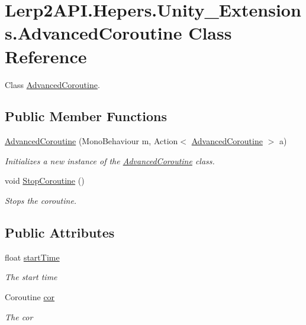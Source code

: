 \hypertarget{class_lerp2_a_p_i_1_1_hepers_1_1_unity___extensions_1_1_advanced_coroutine}{}\section{Lerp2\+A\+P\+I.\+Hepers.\+Unity\+\_\+\+Extensions.\+Advanced\+Coroutine Class Reference}
\label{class_lerp2_a_p_i_1_1_hepers_1_1_unity___extensions_1_1_advanced_coroutine}


Class \hyperlink{class_lerp2_a_p_i_1_1_hepers_1_1_unity___extensions_1_1_advanced_coroutine}{Advanced\+Coroutine}.  


\subsection*{Public Member Functions}
\begin{DoxyCompactItemize}
\item 
\hyperlink{class_lerp2_a_p_i_1_1_hepers_1_1_unity___extensions_1_1_advanced_coroutine_a14d132def872c565dfa3b77d6f832232}{Advanced\+Coroutine} (Mono\+Behaviour m, Action$<$ \hyperlink{class_lerp2_a_p_i_1_1_hepers_1_1_unity___extensions_1_1_advanced_coroutine}{Advanced\+Coroutine} $>$ a)
\begin{DoxyCompactList}\small\item\em Initializes a new instance of the \hyperlink{class_lerp2_a_p_i_1_1_hepers_1_1_unity___extensions_1_1_advanced_coroutine}{Advanced\+Coroutine} class. \end{DoxyCompactList}\item 
void \hyperlink{class_lerp2_a_p_i_1_1_hepers_1_1_unity___extensions_1_1_advanced_coroutine_ae7dae6baba26e1cc973698310b9dfb8f}{Stop\+Coroutine} ()
\begin{DoxyCompactList}\small\item\em Stops the coroutine. \end{DoxyCompactList}\end{DoxyCompactItemize}
\subsection*{Public Attributes}
\begin{DoxyCompactItemize}
\item 
float \hyperlink{class_lerp2_a_p_i_1_1_hepers_1_1_unity___extensions_1_1_advanced_coroutine_a0bf02bd7f7aa10ce232832aa5f0da1b8}{start\+Time}
\begin{DoxyCompactList}\small\item\em The start time \end{DoxyCompactList}\item 
Coroutine \hyperlink{class_lerp2_a_p_i_1_1_hepers_1_1_unity___extensions_1_1_advanced_coroutine_a9e2eca28b70c222f63ec508e413f790d}{cor}
\begin{DoxyCompactList}\small\item\em The cor \end{DoxyCompactList}\end{DoxyCompactItemize}


